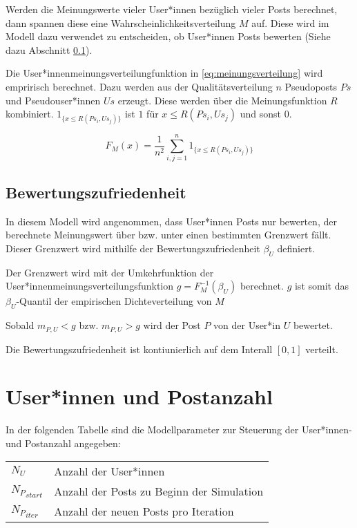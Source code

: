 Werden die Meinungswerte vieler User*innen bezüglich vieler Posts berechnet, dann spannen diese eine Wahrscheinlichkeitsverteilung $M$ auf. Diese wird im Modell dazu verwendet zu entscheiden, ob User*innen Posts bewerten (Siehe dazu Abschnitt \ref{bewertungszufriedenheit}).

Die User*innenmeinungsverteilungfunktion in \ref{eq:meinungsverteilung} wird empririsch berechnet. Dazu werden aus der Qualitätsverteilung $n$ Pseudoposts $Ps$ und Pseudouser*innen $Us$ erzeugt. Diese werden über die Meinungsfunktion $R$ kombiniert. $1_{\{x \leq R(Ps_i,Us_j)\}}$ ist $1$ für $x \leq R(Ps_i,Us_j)$ und sonst $0$.

\begin{equation}
\label{eq:meinungsverteilung}
F_M(x) = \frac{1}{n^2}\sum_{i,j = 1}^{n} 1_{\{x \leq R(Ps_i,Us_j)\}}
\end{equation}


\subsection{Bewertungszufriedenheit}
\label{bewertungszufriedenheit}
In diesem Modell wird angenommen, dass User*innen Posts nur bewerten, der berechnete Meinungswert über bzw. unter einen bestimmten Grenzwert fällt. Dieser Grenzwert wird mithilfe der Bewertungszufriedenheit $\beta_U$ definiert.

Der Grenzwert wird mit der Umkehrfunktion der User*innenmeinungsverteilungsfunktion $g = F_M^{-1}(\beta_U)$ berechnet.
$g$ ist somit das $\beta_U$-Quantil der empirischen Dichteverteilung von $M$

Sobald $m_{P,U} < g$ bzw. $m_{P,U} > g$ wird der Post $P$ von der User*in $U$ bewertet. 

Die Bewertungszufriedenheit ist kontiunierlich auf dem Interall $[0,1]$ verteilt. 


\section{User*innen und Postanzahl}

In der folgenden Tabelle sind die Modellparameter zur Steuerung der User*innen- und Postanzahl angegeben:

\begin{table}[!htbp]
	\begin{tabularx}{\textwidth}{lX}
		$N_U$&  Anzahl der User*innen\\
		${N_P}_{start}$ & Anzahl der Posts zu Beginn der Simulation \\
		${N_P}_{iter}$ & Anzahl der neuen Posts pro Iteration\\
	\end{tabularx}
\end{table}


